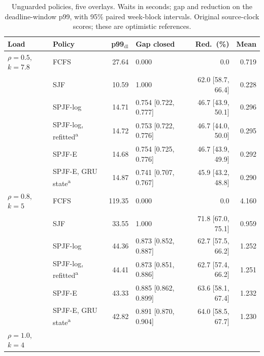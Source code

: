 \documentclass[mathematics,supfile,submit,moreauthors]{Definitions/mdpi}
\newcommand{\devnum}[1]{#1}
\begin{document}
\begin{table}[htbp]
\centering
\caption{Unguarded policies, five overlays. Waits in seconds; gap and reduction on the
deadline-window p99, with \devnum{95\%} paired week-block intervals. Original
source-clock scores; these are optimistic references.}
\label{tab:s_rank}
\small
\setlength{\tabcolsep}{4pt}
\begin{tabular}{llrlrr}
\toprule
Load & Policy & p99$_{\mathrm{dl}}$ & Gap closed & Red.\ (\%) & Mean \\
\midrule
$\rho = \devnum{0.5}$, $k = \devnum{7.8}$
 & FCFS                 & \devnum{27.64} & \devnum{0.000} & \devnum{0.0} & \devnum{0.719} \\
 & SJF                  &\devnum{10.59} & \devnum{1.000} & \devnum{62.0 [58.7, 66.4]} & \devnum{0.228} \\
 & SPJF-log             &\devnum{14.71} & \devnum{0.754 [0.722, 0.777]} & \devnum{46.7 [43.9, 50.1]} & \devnum{0.296} \\
 & SPJF-log, refitted\textsuperscript{a}   &\devnum{14.72} & \devnum{0.753 [0.722, 0.776]} & \devnum{46.7 [44.0, 50.0]} & \devnum{0.295} \\
 & SPJF-E               &\devnum{14.68} & \devnum{0.754 [0.725, 0.776]} & \devnum{46.7 [43.9, 49.9]} & \devnum{0.292} \\
 & SPJF-E, GRU state\textsuperscript{a}    &\devnum{14.87} & \devnum{0.741 [0.707, 0.767]} & \devnum{45.9 [43.2, 48.8]} & \devnum{0.290} \\
\midrule
$\rho = \devnum{0.8}$, $k = \devnum{5}$
 & FCFS                 & \devnum{119.35} & \devnum{0.000} & \devnum{0.0} & \devnum{4.160} \\
 & SJF                  &\devnum{33.55} & \devnum{1.000} & \devnum{71.8 [67.0, 75.1]} & \devnum{0.959} \\
 & SPJF-log             &\devnum{44.36} & \devnum{0.873 [0.852, 0.887]} & \devnum{62.7 [57.5, 66.2]} & \devnum{1.252} \\
 & SPJF-log, refitted\textsuperscript{a}   &\devnum{44.41} & \devnum{0.873 [0.851, 0.886]} & \devnum{62.7 [57.4, 66.2]} & \devnum{1.251} \\
 & SPJF-E               &\devnum{43.33} & \devnum{0.885 [0.862, 0.899]} & \devnum{63.6 [58.1, 67.4]} & \devnum{1.232} \\
 & SPJF-E, GRU state\textsuperscript{a}    &\devnum{42.82} & \devnum{0.891 [0.870, 0.904]} & \devnum{64.0 [58.5, 67.7]} & \devnum{1.230} \\
\midrule
$\rho = \devnum{1.0}$, $k = \devnum{4}$

\end{tabular}
\end{table}
\end{document}
